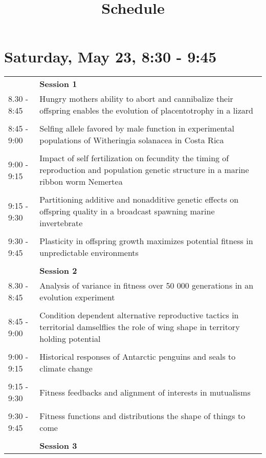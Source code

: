 \documentclass{article}
\title{Schedule}
\date{}
\begin{document}
\maketitle{}
\section{Saturday, May 23, 8:30 - 9:45}
\begin{longtabu} to \textwidth {lX}
 & \textbf{Session 1} \\ 

8.30 - 8:45 & Hungry mothers ability to abort and cannibalize their offspring enables the evolution of placentotrophy in a lizard \\ 
 &  \\ 
8:45 - 9:00 & Selfing allele favored by male function in experimental populations of Witheringia solanacea in Costa Rica \\ 
 &  \\ 
9:00 - 9:15 & Impact of self fertilization on fecundity  the timing of reproduction  and population genetic structure  in a marine ribbon worm  Nemertea \\ 
 &  \\ 
9:15 - 9:30 & Partitioning additive and nonadditive genetic effects on offspring quality in a broadcast spawning marine invertebrate \\ 
 &  \\ 
9:30 - 9:45 & Plasticity in offspring growth maximizes potential fitness in unpredictable environments \\ 
 &  \\ 
 & \textbf{Session 2} \\ 

8.30 - 8:45 & Analysis of variance in fitness over 50 000 generations in an evolution experiment \\ 
 &  \\ 
8:45 - 9:00 & Condition dependent alternative reproductive tactics in territorial damselflies  the role of wing shape in territory holding potential \\ 
 &  \\ 
9:00 - 9:15 & Historical responses of Antarctic penguins and seals to climate change \\ 
 &  \\ 
9:15 - 9:30 & Fitness feedbacks and alignment of interests in mutualisms \\ 
 &  \\ 
9:30 - 9:45 & Fitness functions and distributions  the shape of things to come \\ 
 &  \\ 
 & \textbf{Session 3} \\ 


\end{longtabu}
\end{document}
